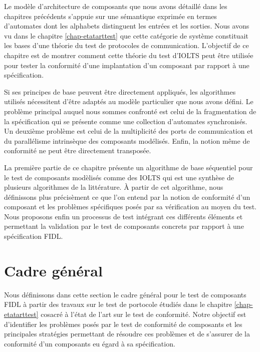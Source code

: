 
Le mod\`ele d'architecture de composants que nous avons
d\'etaill\'e dans les chapitres pr\'ec\'edents s'appuie sur une
s\'emantique exprim\'ee en termes d'automates dont les alphabets
distinguent les entr\'ees et les sorties. Nous avons vu dans le chapitre
\ref{chap-etatarttest} que cette cat\'egorie de syst\`eme
constituait les bases d'une th\'eorie  du test de protocoles de
communication. L'objectif de ce chapitre est de montrer comment cette
th\'eorie du test d'\textsf{IOLTS} peut \^etre utilis\'ee pour
tester la conformit\'e d'une implantation d'un composant par rapport
\`a une sp\'ecification. 

Si ses principes de base  peuvent \^etre
directement appliqu\'es, les algorithmes utilis\'es n\'ecessitent
d'\^etre adapt\'es au mod\`ele particulier que nous avons
d\'efini. Le probl\`eme principal auquel nous sommes confront\'e
est celui de la fragmentation de la sp\'ecification qui se
pr\'esente comme une collection d'automates synchronis\'es. Un
deuxi\`eme probl\`eme est celui de la multiplicit\'e des ports de
communication et du parall\'elisme intrins\`eque des composants
mod\'elis\'es. Enfin, la notion m\^eme de conformit\'e ne peut
\^etre directement transpos\'ee.

La premi\`ere partie de ce chapitre pr\'esente un algorithme de base
s\'equentiel pour le test de composants mod\`elis\'es comme des
\textsf{IOLTS} qui est une synth\`ese de plusieurs algorithmes
de la litt\'erature. \`A partir de cet algorithme, nous
d\'efinissons plus pr\'ecis\`ement ce que l'on entend par la notion
de conformit\'e d'un composant et les probl\`emes sp\'ecifiques
pos\'es par sa v\'erification au moyen du test. Nous proposons enfin
un processus de test int\'egrant ces diff\'erents
\'el\'ements et permettant la validation par le test de composants
concrets par rapport \`a une sp\'ecification \textsf{FIDL}.

\section{Cadre g\'en\'eral}

Nous d\'efinissons dans cette section le cadre g\'en\'eral pour le
test de composants \textsf{FIDL} \`a partir des travaux sur le test de
portocole \'etudi\'es dans le chapitre \ref{chap-etatarttest}
cosacr\'e \`a l'\'etat de l'art sur le test de conformit\'e. Notre
objectif est d'identifier les probl\`emes pos\'es par le test de
conformit\'e de composants et les principales strat\'egies
permettant de r\'esoudre ces probl\`emes et de s'assurer de la
conformit\'e d'un composants eu \'egard \`a sa sp\'ecification.

